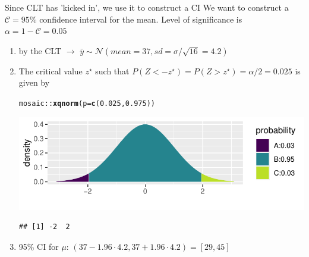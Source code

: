 \documentclass[10pt]{beamer}\usepackage[]{graphicx}\usepackage[]{color}
\makeatletter
\def\maxwidth{ %
  \ifdim\Gin@nat@width>\linewidth
    \linewidth
  \else
    \Gin@nat@width
  \fi
}
\newcommand{\hlnum}[1]{\textcolor[rgb]{0.686,0.059,0.569}{#1}}%
\newcommand{\hlopt}[1]{\textcolor[rgb]{0,0,0}{#1}}%
\newcommand{\hlstd}[1]{\textcolor[rgb]{0.345,0.345,0.345}{#1}}%
\newcommand{\hlkwc}[1]{\textcolor[rgb]{0.333,0.667,0.333}{#1}}%
\newcommand{\hlkwd}[1]{\textcolor[rgb]{0.737,0.353,0.396}{\textbf{#1}}}%
\newenvironment{kframe}{%
 \def\at@end@of@kframe{}%
 \ifinner\ifhmode%
  \def\at@end@of@kframe{\end{minipage}}%
  \begin{minipage}{\columnwidth}%
 \fi\fi%
 \def\FrameCommand##1{\hskip\@totalleftmargin \hskip-\fboxsep
 \colorbox{shadecolor}{##1}\hskip-\fboxsep
     \hskip-\linewidth \hskip-\@totalleftmargin \hskip\columnwidth}%
 \MakeFramed {\advance\hsize-\width
   \@totalleftmargin\z@ \linewidth\hsize
   \@setminipage}}%
 {\par\unskip\endMakeFramed%
 \at@end@of@kframe}
\newenvironment{knitrout}{}{} %
\makeatother
\begin{document}
\begin{frame}[fragile]{Since CLT has 'kicked in', we use it to construct a CI}
	\small
	We want to construct a $\mathcal{C} = 95\%$ confidence interval for the mean. Level of significance is $\alpha = 1-\mathcal{C} = 0.05$ \pause
	
	\begin{enumerate}
		\setlength\itemsep{1em}
		\item by the CLT $\to$ $\bar{y} \sim \mathcal{N}(mean = 37, sd = \sigma/\sqrt{16} = 4.2)$ \pause
		\item The critical value $z^\star$ such that $P(Z < -z^\star) = P(Z > z^\star) = \alpha/2 = 0.025$ is given by 
\begin{knitrout}\tiny
{}\color{fgcolor}\begin{kframe}
\begin{alltt}
\hlstd{mosaic}\hlopt{::}\hlkwd{xqnorm}\hlstd{(}\hlkwc{p} \hlstd{=} \hlkwd{c}\hlstd{(}\hlnum{0.025}\hlstd{,} \hlnum{0.975}\hlstd{))}
\end{alltt}
\end{kframe}

{\centering \includegraphics[width=\maxwidth]{figure/unnamed-chunk-4-1} 

}


\begin{kframe}\begin{verbatim}
## [1] -2  2
\end{verbatim}
\end{kframe}
\end{knitrout}
		\pause
		\item 95\% CI for $\mu$: $(37 - 1.96 \cdot 4.2, 37 + 1.96 \cdot 4.2) = [29, 45]$
	\end{enumerate}
\end{frame}
\end{document}
